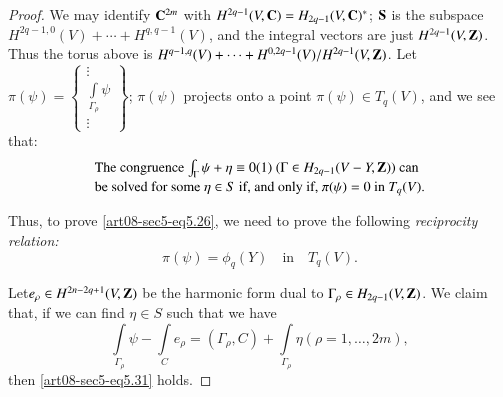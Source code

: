 \begin{proof}
We may identify $\mathbf{C}^{2m}$ with $H^{2q-1}(V,\mathbf{C})=H_{2q-1}(V,\mathbf{C})^{*}$; $\mathbf{S}$ is the subspace $H^{2q-1,0}(V)+\cdots+H^{q,q-1}(V)$, and the integral vectors are just $H^{2q-1}(V,\mathbf{Z})$. Thus the torus above is $H^{q-1,q}(V)+\cdots+H^{0,2q-1}(V)/H^{2q-1}(V,\mathbf{Z})$. Let $\pi(\psi)=\left\{\begin{smallmatrix} \vdots\\ \int\limits_{\Gamma_{\rho}}\psi\\ \vdots\end{smallmatrix}\right\}$; $\pi(\psi)$ projects onto a point $\pi(\psi)\in T_{q}(V)$, and we see that:
\begin{equation}
\begin{array}{l}
\text{The congruence $\int_{\Gamma}\psi+\eta\equiv 0(1)$ $(\Gamma\in H_{2q-1}(V-Y,\mathbf{Z}))$ can}\\[2pt]
\text{be solved for some $\eta\in S$ if, and only if, $\pi(\psi)=0$ in $T_{q}(V)$.}
\end{array}\label{art08-sec5-eq5.30}
\end{equation}

Thus, to prove \eqref{art08-sec5-eq5.26}, we need to prove the following {\em reciprocity relation:}
\begin{equation}
\pi(\psi)=\phi_{q}(Y)\text{~~ in~~ } T_{q}(V).\label{art08-sec5-eq5.31}
\end{equation}

Let\pageoriginale $e_{\rho}\in H^{2n-2q+1}(V,\mathbf{Z})$ be the harmonic form dual to $\Gamma_{\rho}\in H_{2q-1}(V,\mathbf{Z})$. We claim that, if we can find $\eta\in S$ such that we have
\begin{equation}
\int\limits_{\Gamma_{\rho}}\psi-\int\limits_{C}e_{\rho}=(\Gamma_{\rho},C)+\int\limits_{\Gamma_{\rho}}\eta(\rho=1,\ldots,2m),\label{art08-sec5-eq5.32}
\end{equation}
then \eqref{art08-sec5-eq5.31} holds.
\end{proof}

